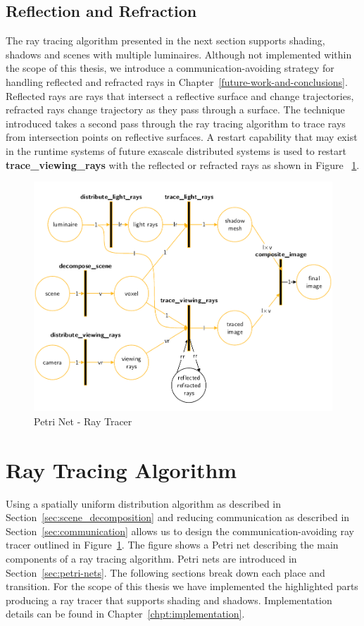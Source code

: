 \subsection{Reflection and Refraction}
The ray tracing algorithm presented in the next section supports shading,
shadows and scenes with multiple luminaires.  Although not implemented within
the scope of this thesis, we introduce a communication-avoiding strategy for
handling reflected and refracted rays in
Chapter~\ref{future-work-and-conclusions}.  Reflected rays are rays that
intersect a reflective surface and change trajectories, refracted rays change
trajectory as they pass through a surface.  The technique introduced takes a
second pass through the ray tracing algorithm to trace rays from intersection
points on reflective surfaces.  A restart capability that may exist in the
runtime systems of future exascale distributed systems is used to restart
\textbf{trace\_viewing\_rays} with the reflected or refracted rays as shown in
Figure ~\ref{fig:design}.

\newpage

\begin{figure}[!htb]
\centering
  \includegraphics[width=\linewidth]{drawings/Design.pdf}
\caption{Petri Net - Ray Tracer}
\label{fig:design}
\end{figure}

\section{Ray Tracing Algorithm}
\label{sec:algorithm}
Using a spatially uniform distribution algorithm as described in 
Section~\ref{sec:scene_decomposition} and reducing communication as described in 
Section~\ref{sec:communication} allows us to design the communication-avoiding 
ray tracer outlined in Figure~\ref{fig:design}.  The figure shows a 
Petri net describing the main components of a ray tracing algorithm.  Petri 
nets are introduced in Section~\ref{sec:petri-nets}.  The following sections 
break down each place and transition.  For the scope of this thesis we have 
implemented the highlighted parts producing a ray tracer that supports shading
and shadows.  Implementation details can be found in 
Chapter~\ref{chpt:implementation}.  

